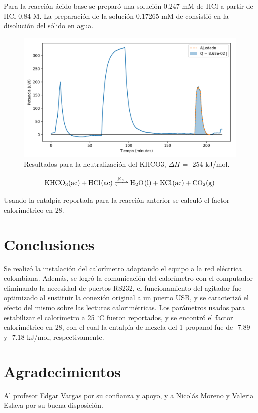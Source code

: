 \documentclass[a0]{sciposter}
\newcommand{\grad}{$^\circ$C}
\newcommand{\figwidth}{0.7\linewidth}
\begin{document}
\begin{multicols}{3}
	Para la reacci\'on \'acido base se prepar\'o una soluci\'on 0.247 mM de HCl a partir de HCl 0.84 M. La preparaci\'on de la soluci\'on 0.17265 mM de  consisti\'o en la disoluci\'on del s\'olido en agua.

	\begin{figure}[h]
		\centering
		\includegraphics[width=\figwidth]{../Data/ChemicalCalibrations/HCl}
		\caption{Resultados para la neutralización del {KHCO3}, $\Delta H$ = -254 kJ/mol.}
	\end{figure}

	\begin{equation}
		\ce{KHCO3(ac) + HCl(ac) <=>[K_a] H2O(l) + KCl(ac) + CO2(g)}
	\end{equation}

	Usando la entalp\'ia reportada para la reacci\'on anterior se calcul\'o el factor calorim\'etrico en 28.
	
\section{Conclusiones}
	Se realiz\'o la instalaci\'on del calorímetro adaptando el equipo a la red eléctrica colombiana. Además, se logró la comunicaci\'on del calor\'imetro con el computador eliminando la necesidad de puertos RS232, el funcionamiento del agitador fue optimizado al sustituir la conexión original a un puerto USB, y se caracteriz\'o el efecto del mismo sobre las lecturas calorim\'etricas. Los parámetros usados para estabilizar el calorímetro a 25 \grad{} fueron reportados, y se encontró el factor calorimétrico en 28, con el cual la entalpía de mezcla del 1-propanol fue de -7.89 y -7.18 kJ/mol, respectivamente.

\printbibliography[heading=bibintoc, title={Referencias}]
\section*{Agradecimientos}
	Al profesor Edgar Vargas por su confianza y apoyo, y a Nicol\'as Moreno y Valeria Eslava por su buena disposici\'on.
\end{multicols}
\end{document}
